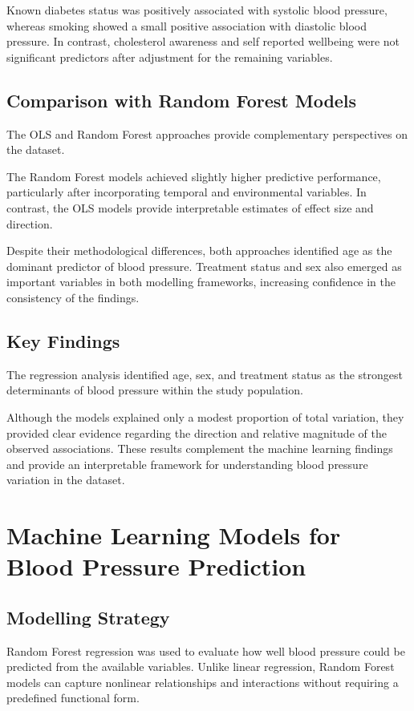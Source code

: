 \documentclass[12pt,a4paper]{article}
\begin{document}
Known diabetes status was positively associated with systolic blood pressure, whereas smoking showed a small positive association with diastolic blood pressure. In contrast, cholesterol awareness and self reported wellbeing were not significant predictors after adjustment for the remaining variables.

\subsection{Comparison with Random Forest Models}

The OLS and Random Forest approaches provide complementary perspectives on the dataset.

The Random Forest models achieved slightly higher predictive performance, particularly after incorporating temporal and environmental variables. In contrast, the OLS models provide interpretable estimates of effect size and direction.

Despite their methodological differences, both approaches identified age as the dominant predictor of blood pressure. Treatment status and sex also emerged as important variables in both modelling frameworks, increasing confidence in the consistency of the findings.

\subsection{Key Findings}

The regression analysis identified age, sex, and treatment status as the strongest determinants of blood pressure within the study population.

Although the models explained only a modest proportion of total variation, they provided clear evidence regarding the direction and relative magnitude of the observed associations. These results complement the machine learning findings and provide an interpretable framework for understanding blood pressure variation in the dataset.
\section{Machine Learning Models for Blood Pressure Prediction}

\subsection{Modelling Strategy}

Random Forest regression was used to evaluate how well blood pressure could be predicted from the available variables. Unlike linear regression, Random Forest models can capture nonlinear relationships and interactions without requiring a predefined functional form.
\end{document}
